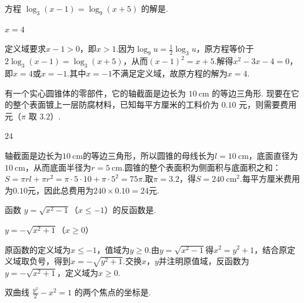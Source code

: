 \documentclass[UTF8,a4paper,oneside,11pt]{ctexbook}
\begin{document}
\begin{problem}
方程 \(\log_3(x - 1) = \log_9(x + 5)\) 的解是\fillinblank{}.
\end{problem}

\begin{answer}
\(x = 4\)
\end{answer}

\begin{solution}
定义域要求\(x-1>0\)，即\(x>1\).因为\(\log_9 u=\frac{1}{2}\log_3u\)，原方程等价于\(2\log_3(x-1)=\log_3(x+5)\)，从而\((x-1)^2=x+5\).解得\(x^2-3x-4=0\)，即\(x=4\)或\(x=-1\).其中\(x=-1\)不满足定义域，故原方程的解为\(x=4\).
\end{solution}

\begin{problem}
有一个实心圆锥体的零部件，它的轴截面是边长为 \(10\mathrm{~cm}\) 的等边三角形. 现要在它的整个表面镀上一层防腐材料，已知每平方厘米的工料价为 \(0.10\) 元，则需要费用\fillinblank{} 元（\(\pi\) 取 \(3.2\)）.
\end{problem}

\begin{answer}
\(24\)
\end{answer}

\begin{solution}
轴截面是边长为\(10\mathrm{~cm}\)的等边三角形，所以圆锥的母线长为\(l=10\mathrm{~cm}\)，底面直径为\(10\mathrm{~cm}\)，从而底面半径为\(r=5\mathrm{~cm}\).圆锥的整个表面积为侧面积与底面积之和：\(S=\pi rl+\pi r^2=\pi\cdot5\cdot10+\pi\cdot5^2=75\pi\).取\(\pi=3.2\)，得\(S=240\mathrm{~cm^2}\).每平方厘米费用为\(0.10\)元，因此总费用为\(240\times0.10=24\)元.
\end{solution}

\begin{problem}
函数 \(y = \sqrt{x^2 - 1}\)（\(x \leqslant -1\)）的反函数是\fillinblank{}.
\end{problem}

\begin{answer}
\(y = -\sqrt{x^2 + 1}\)（\(x \geqslant 0\)）
\end{answer}

\begin{solution}
原函数的定义域为\(x\leqslant-1\)，值域为\(y\geqslant0\).由\(y=\sqrt{x^2-1}\)得\(x^2=y^2+1\)，结合原定义域取负号，得到\(x=-\sqrt{y^2+1}\).交换\(x\)，\(y\)并注明原值域，反函数为\(y=-\sqrt{x^2+1}\)，定义域为\(x\geqslant0\).
\end{solution}

\begin{problem}
双曲线 \(\frac{y^2}{2} - x^2 = 1\) 的两个焦点的坐标是\fillinblank{}.
\end{problem}
\end{document}
